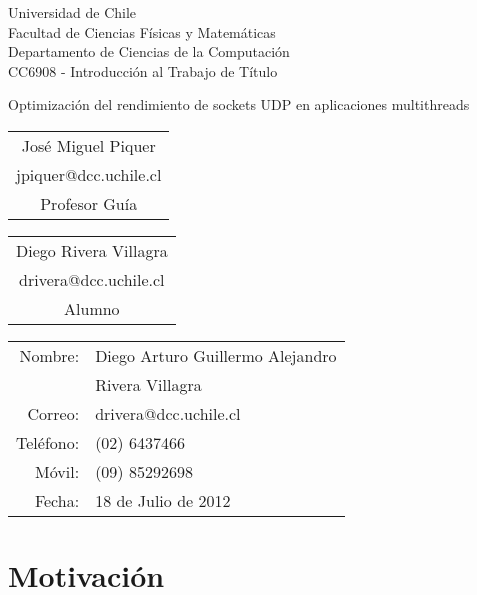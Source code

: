 \documentclass[12pt,spanish,letterpaper]{article}
\begin{document}
\thispagestyle{empty}
\begin{minipage}{\textwidth}
	Universidad de Chile\\
	Facultad de Ciencias Físicas y Matemáticas\\
	Departamento de Ciencias de la Computación\\
	CC6908 - Introducción al Trabajo de Título
\end{minipage}
\vfill
\begin{minipage}{\textwidth}
	\begin{center}
		\huge{Optimización del rendimiento de sockets UDP en aplicaciones multithreads}
	\end{center}
\end{minipage}
\vfill
\begin{minipage}{\textwidth}
	\begin{tabular}{c}
		\hline
		José Miguel Piquer\\
		jpiquer@dcc.uchile.cl\\
		Profesor Guía
	\end{tabular}
	\hfill
	\begin{tabular}{c}
		\hline
		Diego Rivera Villagra\\
		drivera@dcc.uchile.cl\\
		Alumno
	\end{tabular}
	\vspace{1.5cm}
\end{minipage}
\begin{minipage}{\textwidth}
	\null
	\hfill
	\begin{minipage}{3.25in}
		\begin{tabular}{rl}
			Nombre:&Diego Arturo Guillermo Alejandro\\
			&Rivera Villagra\\
			Correo:&drivera@dcc.uchile.cl\\
			Teléfono:&(02) 6437466\\
			Móvil:&(09) 85292698\\
			Fecha:&18 de Julio de 2012
		\end{tabular}
	\end{minipage}
\end{minipage}
\newpage
{}
\tableofcontents
\newpage
{}
\section{Motivación}
\end{document}
